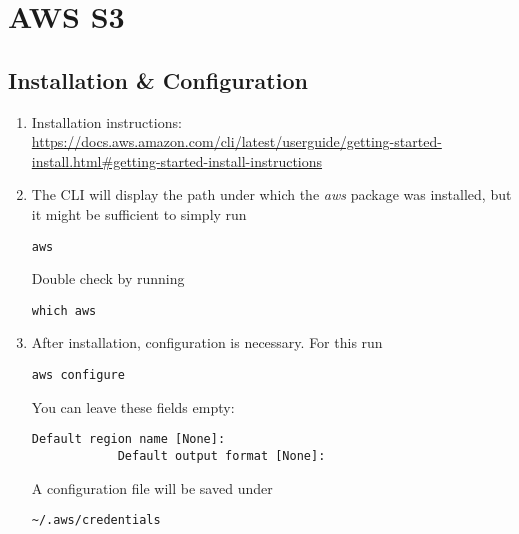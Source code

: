 \documentclass[12pt, a4paper]{article}
\numberwithin{equation}{section}
\theoremstyle{definition}
\theoremstyle{definition}
\begin{document}
	\newpage 
	
	\section{AWS S3} 
	
	\subsection{Installation \& Configuration}
	
	\begin{enumerate}
		\item Installation instructions:~ \url{https://docs.aws.amazon.com/cli/latest/userguide/getting-started-install.html#getting-started-install-instructions}
		\item The CLI will display the path under which the \textit{aws} package was installed, but it might be sufficient to simply run 
		
		\begin{lstlisting}[style=mystylebash, label=alg:aws, xleftmargin=\parindent]
			aws
		\end{lstlisting}
		
		Double check by running 
		
		\begin{lstlisting}[style=mystylebash, label=alg:aws_path, xleftmargin=\parindent]
			which aws
		\end{lstlisting}
		
		\item After installation, configuration is necessary. For this run
		
		\begin{lstlisting}[style=mystylebash, label=alg:aws_configure, xleftmargin=\parindent]
			aws configure
		\end{lstlisting}
		
		You can leave these fields empty:
		
		\begin{lstlisting}[style=mystylebash, label=alg:aws_configure__default_reg, xleftmargin=\parindent]
			Default region name [None]:
			Default output format [None]:
		\end{lstlisting}
		
		A configuration file will be saved under 
		
		\begin{lstlisting}[style=mystylebash, label=alg:aws__config_file, xleftmargin=\parindent]
			~/.aws/credentials
		\end{lstlisting}
		

\end{enumerate}
\end{document}
